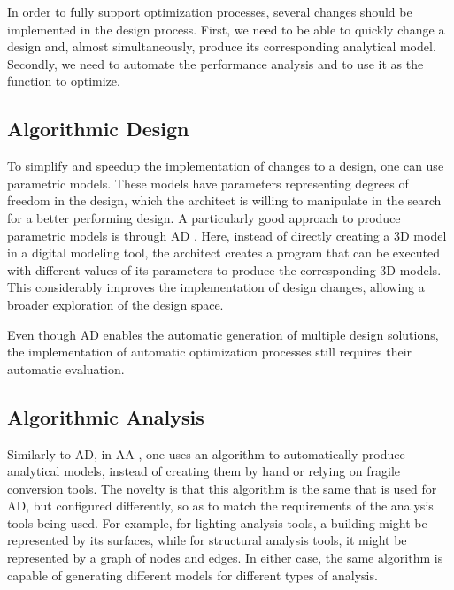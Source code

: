 	In order to fully support optimization processes, several changes should be implemented in the design process. First, we need to be able to quickly change a design and, almost simultaneously, produce its corresponding analytical model. Secondly, we need to automate the performance analysis and to use it as the function to optimize.
	
	
	
	\subsection{Algorithmic Design}
	To simplify and speedup the implementation of changes to a design, one can use parametric models. These models have parameters representing degrees of freedom in the design, which the architect is willing to manipulate in the search for a better performing design. A particularly good approach to produce parametric models is through \ac{AD} \cite{Terzidis2006}. Here, instead of directly creating a 3D model in a digital modeling tool, the architect creates a program that can be executed with different values of its parameters to produce the corresponding 3D models. This considerably improves the implementation of design changes, allowing a broader exploration of the design space.
	
	Even though \ac{AD} enables the automatic generation of multiple design solutions, the implementation of automatic optimization processes still requires their automatic evaluation.
	
	\subsection{Algorithmic Analysis}
	Similarly to \ac{AD}, in \ac{AA} \cite{Aguiar2017}, one uses an algorithm to automatically produce analytical models, instead of creating them by hand or relying on fragile conversion tools. The novelty is that this algorithm is the same that is used for \ac{AD}, but configured differently, so as to match the requirements of the analysis tools being used. For example, for lighting analysis tools, a building might be represented by its surfaces, while for structural analysis tools, it might be represented by a graph of nodes and edges. In either case, the same algorithm is capable of generating different models for different types of analysis.
	
